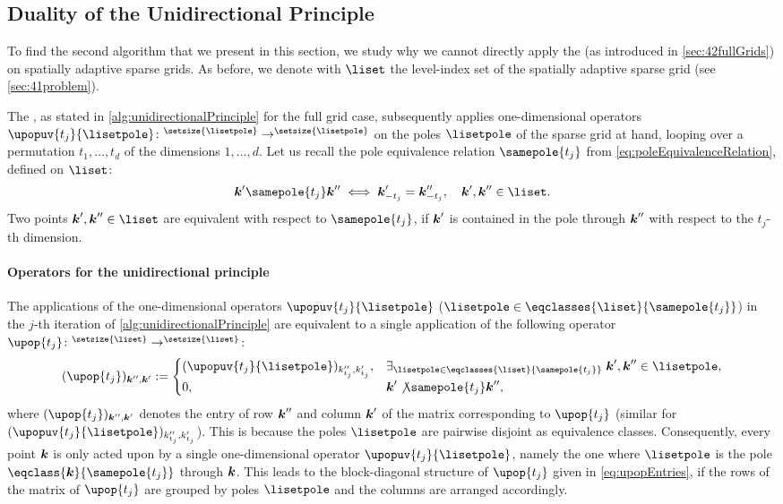 \subsection{Duality of the Unidirectional Principle}
\label{sec:452duality}

To find the second algorithm that we present in this section,
we study why we cannot directly apply the \up
(as introduced in \cref{sec:42fullGrids}) on spatially adaptive sparse grids.
As before, we denote with $\liset$ the level-index set of
the spatially adaptive sparse grid (see \cref{sec:41problem}).

The \up, as stated in
\cref{alg:unidirectionalPrinciple} for the full grid case,
subsequently applies one-dimensional operators
$\upopuv{t_j}{\lisetpole}\colon \real^{\setsize{\lisetpole}} \to
\real^{\setsize{\lisetpole}}$
on the poles $\lisetpole$ of the sparse grid at hand,
looping over a permutation $t_1, \dotsc, t_d$
of the dimensions $1, \dotsc, d$.
Let us recall the pole equivalence relation $\samepole{t_j}$
from \cref{eq:poleEquivalenceRelation}, defined on $\liset$:
\begin{equation}
  \*k' \samepole{t_j} \*k'' \iff \*k'_{-t_j} = \*k''_{-t_j},\quad
  \*k', \*k'' \in \liset.
\end{equation}
Two points $\*k', \*k'' \in \liset$ are equivalent with respect to
$\samepole{t_j}$, if ${\boldsymbol{k}}'$ is contained in the pole through ${\boldsymbol{k}}''$
with respect to the $t_j$-th dimension.

\paragraph{Operators for the unidirectional principle}

The applications of the one-dimensional operators
$\upopuv{t_j}{\lisetpole}$
($\lisetpole \in \eqclasses{\liset}{\samepole{t_j}}$)
in the $j$-th iteration of \cref{alg:unidirectionalPrinciple}
are equivalent to a single application of the following operator
$\upop{t_j}\colon \real^{\setsize{\liset}} \to \real^{\setsize{\liset}}$:
\begin{equation}
  \label{eq:upopEntries}
  (\upop{t_j})_{\*k'',\*k'}
  :=
  \begin{cases}
    (\upopuv{t_j}{\lisetpole})_{k''_{t_j},k'_{t_j}},&
    \ex{\lisetpole \in \eqclasses{\liset}{\samepole{t_j}}}{
      \*k', \*k'' \in \lisetpole
    },\\
    0,&\*k' \not\samepole{t_j} \*k'',
  \end{cases}
\end{equation}
where $(\upop{t_j})_{\*k'',\*k'}$ denotes the entry of row ${\boldsymbol{k}}''$
and column ${\boldsymbol{k}}'$ of the matrix corresponding to $\upop{t_j}$
(similar for $(\upopuv{t_j}{\lisetpole})_{k''_{t_j},k'_{t_j}}$).
This is because the poles $\lisetpole$ are pairwise disjoint
as equivalence classes.
Consequently, every point ${\boldsymbol{k}}$ is only acted upon by a single
one-dimensional operator $\upopuv{t_j}{\lisetpole}$,
namely the one where $\lisetpole$ is the
pole $\eqclass{\*k}{\samepole{t_j}}$ through ${\boldsymbol{k}}$.
This leads to the block-diagonal structure
of $\upop{t_j}$ given in \eqref{eq:upopEntries},
if the rows of the matrix of $\upop{t_j}$
are grouped by poles $\lisetpole$ and the columns are arranged accordingly.

